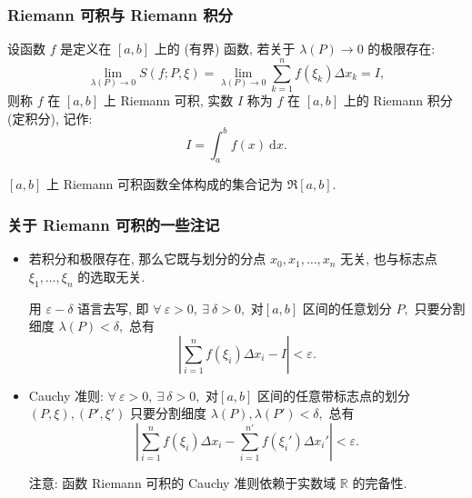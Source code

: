 
\begin{frame}
\frametitle{Riemann 可积与 Riemann 积分}

\begin{Def}
设函数 $f$ 是定义在 $[a,b]$ 上的 (有界) 函数, 若关于 $\lambda(P) \to 0$ 的极限存在:
\begin{equation*}
\lim_{\lambda(P) \to 0} S(f; P,\xi) = \lim_{\lambda(P) \to 0} \sum_{k=1}^n f(\xi_k)\Delta x_k = I,
\end{equation*}
则称 $f$ 在 $[a,b]$ 上 Riemann 可积, 实数 $I$ 称为 $f$ 在 $[a, b]$ 上的 Riemann 积分 (定积分), 记作:
\begin{equation*}
I = \int_a^b f(x) ~ \mathrm{d}x.
\end{equation*}

\end{Def}

\pause

$[a,b]$ 上 Riemann 可积函数全体构成的\alert{集合}记为 $\mathfrak{R}[a,b].$


\end{frame}


\begin{frame}
\frametitle{关于 Riemann 可积的一些注记}

\begin{itemize}[<+->]
\item 若积分和极限存在, 那么它既与划分的分点 $x_0, x_1 ,\dots, x_n$ 无关, 也与标志点 $\xi_1, \dots, \xi_n$ 的选取无关.

用 $\varepsilon-\delta$ 语言去写, 即 $\forall~\varepsilon > 0, ~ \exists~\delta > 0,$ 对$[a,b]$ 区间的任意划分 $P,$ 只要分割细度 $\lambda(P) < \delta,$ 总有
\[\left|\sum_{i=1}^n f(\xi_i)\Delta x_i - I\right| < \varepsilon.\]
\item Cauchy 准则: $\forall~\varepsilon > 0, ~ \exists~\delta > 0,$ 对$[a,b]$ 区间的任意带标志点的划分 $(P, \xi), (P', \xi')$ 只要分割细度 $\lambda(P), \lambda(P') < \delta,$ 总有
\[\left|\sum_{i=1}^n f(\xi_i)\Delta x_i - \sum_{i=1}^{n'} f(\xi_i')\Delta x_i' \right| < \varepsilon.\]

\pause

\alert{注意:} 函数 Riemann 可积的 Cauchy 准则依赖于实数域 $\mathbb{R}$ 的\alert{完备性}.
\end{itemize}

\end{frame}

